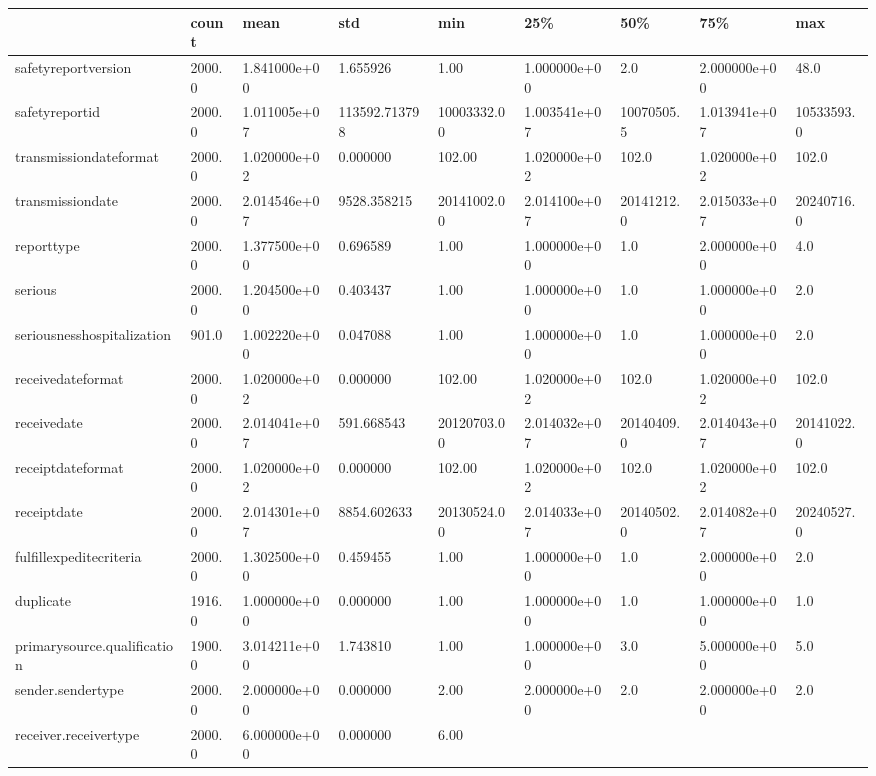 \documentclass[
  letterpaper,
  DIV=11,
  numbers=noendperiod]{scrartcl}
\begin{document}
\begin{longtable}[]{@{}lllllllll@{}}
\toprule\noalign{}
& count & mean & std & min & 25\% & 50\% & 75\% & max \\
\midrule\noalign{}
\endhead
\bottomrule\noalign{}
\endlastfoot
safetyreportversion & 2000.0 & 1.841000e+00 & 1.655926 & 1.00 &
1.000000e+00 & 2.0 & 2.000000e+00 & 48.0 \\
safetyreportid & 2000.0 & 1.011005e+07 & 113592.713798 & 10003332.00 &
1.003541e+07 & 10070505.5 & 1.013941e+07 & 10533593.0 \\
transmissiondateformat & 2000.0 & 1.020000e+02 & 0.000000 & 102.00 &
1.020000e+02 & 102.0 & 1.020000e+02 & 102.0 \\
transmissiondate & 2000.0 & 2.014546e+07 & 9528.358215 & 20141002.00 &
2.014100e+07 & 20141212.0 & 2.015033e+07 & 20240716.0 \\
reporttype & 2000.0 & 1.377500e+00 & 0.696589 & 1.00 & 1.000000e+00 &
1.0 & 2.000000e+00 & 4.0 \\
serious & 2000.0 & 1.204500e+00 & 0.403437 & 1.00 & 1.000000e+00 & 1.0 &
1.000000e+00 & 2.0 \\
seriousnesshospitalization & 901.0 & 1.002220e+00 & 0.047088 & 1.00 &
1.000000e+00 & 1.0 & 1.000000e+00 & 2.0 \\
receivedateformat & 2000.0 & 1.020000e+02 & 0.000000 & 102.00 &
1.020000e+02 & 102.0 & 1.020000e+02 & 102.0 \\
receivedate & 2000.0 & 2.014041e+07 & 591.668543 & 20120703.00 &
2.014032e+07 & 20140409.0 & 2.014043e+07 & 20141022.0 \\
receiptdateformat & 2000.0 & 1.020000e+02 & 0.000000 & 102.00 &
1.020000e+02 & 102.0 & 1.020000e+02 & 102.0 \\
receiptdate & 2000.0 & 2.014301e+07 & 8854.602633 & 20130524.00 &
2.014033e+07 & 20140502.0 & 2.014082e+07 & 20240527.0 \\
fulfillexpeditecriteria & 2000.0 & 1.302500e+00 & 0.459455 & 1.00 &
1.000000e+00 & 1.0 & 2.000000e+00 & 2.0 \\
duplicate & 1916.0 & 1.000000e+00 & 0.000000 & 1.00 & 1.000000e+00 & 1.0
& 1.000000e+00 & 1.0 \\
primarysource.qualification & 1900.0 & 3.014211e+00 & 1.743810 & 1.00 &
1.000000e+00 & 3.0 & 5.000000e+00 & 5.0 \\
sender.sendertype & 2000.0 & 2.000000e+00 & 0.000000 & 2.00 &
2.000000e+00 & 2.0 & 2.000000e+00 & 2.0 \\
receiver.receivertype & 2000.0 & 6.000000e+00 & 0.000000 & 6.00 &

\end{longtable}
\end{document}
